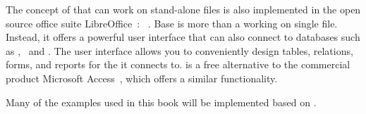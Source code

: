 The concept of  that can work on stand-alone files is also implemented in the open source office suite LibreOffice~\cite{DF2024LTDF,GL2012LTSOOSSCBAFACSOL,S2022L7PFEUU}: ~\cite{FNFHWSKLSSGLFRSRPLJG2022BG7R1BOL7C,S2022L7PFEUU}.
Base is more than a  working on single file.
Instead, it offers a powerful user interface that can also connect to databases such as \mysql, \mariadb\ and \postgresql.
The user interface allows you to conveniently design tables, relations, forms, and reports for the  it connects to.
 is a free alternative to the commercial product Microsoft Access~\cite{SSI2023MA2BTA,B2020HOMA2,UC2021AFD}, which offers a similar functionality.

Many of the examples used in this book will be implemented based on \postgresql.%
%
\endhsection
%
\endhsection%
%

